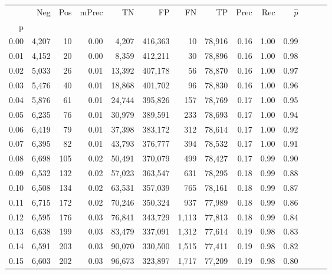 \begin{tabular}{rrrrrrrrrrrrrr}
\toprule
{} &    Neg &    Pos & mPrec &       TN &       FP &      FN &      TP &  Prec &   Rec & $\hat{p}$ \\
p    &        &        &       &          &          &         &         &       &       &           \\
\midrule
0.00 &  4,207 &     10 &  0.00 &    4,207 &  416,363 &      10 &  78,916 &  0.16 &  1.00 &      0.99 \\
0.01 &  4,152 &     20 &  0.00 &    8,359 &  412,211 &      30 &  78,896 &  0.16 &  1.00 &      0.98 \\
0.02 &  5,033 &     26 &  0.01 &   13,392 &  407,178 &      56 &  78,870 &  0.16 &  1.00 &      0.97 \\
0.03 &  5,476 &     40 &  0.01 &   18,868 &  401,702 &      96 &  78,830 &  0.16 &  1.00 &      0.96 \\
0.04 &  5,876 &     61 &  0.01 &   24,744 &  395,826 &     157 &  78,769 &  0.17 &  1.00 &      0.95 \\
0.05 &  6,235 &     76 &  0.01 &   30,979 &  389,591 &     233 &  78,693 &  0.17 &  1.00 &      0.94 \\
0.06 &  6,419 &     79 &  0.01 &   37,398 &  383,172 &     312 &  78,614 &  0.17 &  1.00 &      0.92 \\
0.07 &  6,395 &     82 &  0.01 &   43,793 &  376,777 &     394 &  78,532 &  0.17 &  1.00 &      0.91 \\
0.08 &  6,698 &    105 &  0.02 &   50,491 &  370,079 &     499 &  78,427 &  0.17 &  0.99 &      0.90 \\
0.09 &  6,532 &    132 &  0.02 &   57,023 &  363,547 &     631 &  78,295 &  0.18 &  0.99 &      0.88 \\
0.10 &  6,508 &    134 &  0.02 &   63,531 &  357,039 &     765 &  78,161 &  0.18 &  0.99 &      0.87 \\
0.11 &  6,715 &    172 &  0.02 &   70,246 &  350,324 &     937 &  77,989 &  0.18 &  0.99 &      0.86 \\
0.12 &  6,595 &    176 &  0.03 &   76,841 &  343,729 &   1,113 &  77,813 &  0.18 &  0.99 &      0.84 \\
0.13 &  6,638 &    199 &  0.03 &   83,479 &  337,091 &   1,312 &  77,614 &  0.19 &  0.98 &      0.83 \\
0.14 &  6,591 &    203 &  0.03 &   90,070 &  330,500 &   1,515 &  77,411 &  0.19 &  0.98 &      0.82 \\
0.15 &  6,603 &    202 &  0.03 &   96,673 &  323,897 &   1,717 &  77,209 &  0.19 &  0.98 &      0.80 \\

\end{tabular}
